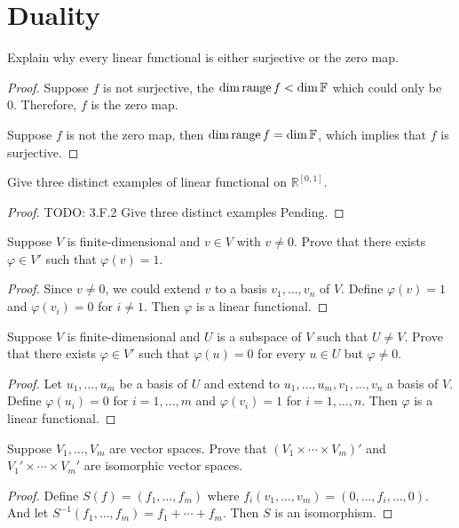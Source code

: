 \section{Duality}

\begin{exercise}
Explain why every linear functional is either surjective or the zero map.
\end{exercise}
\begin{proof}
	Suppose $f$ is not surjective, the $\operatorname{dim} \mathop{\mathrm{range}} f < \operatorname{dim} \mathbb{F}$ which could only be 0. Therefore, $f$ is the zero map. \par
	Suppose $f$ is not the zero map, then $\operatorname{dim} \mathop{\mathrm{range}} f = \operatorname{dim} \mathbb{F}$, which implies that $f$ is surjective.
\end{proof}

\begin{exercise}
Give three distinct examples of linear functional on $\mathbb{R}^{[0,1]}$.
\end{exercise}
\begin{proof}
	TODO: 3.F.2 Give three distinct examples Pending.
\end{proof}

\newpage
\begin{exercise}
Suppose $V $ is finite-dimensional and $v \in V$ with $v \neq 0.$ Prove that there exists $\varphi \in V'$ such that $\varphi(v) = 1$.
\end{exercise}
\begin{proof}
	Since $v \neq 0$, we could extend $v$ to a basis $v_1, \ldots ,v_n$ of $V$. Define $\varphi(v) = 1$ and $\varphi(v_i) = 0$ for $i \neq 1$. Then $\varphi$ is a linear functional.
\end{proof}

\begin{exercise}
Suppose $V $ is finite-dimensional and $U$ is a subspace of $V$ such that $U \neq V$. Prove that there exists $\varphi \in V'$ such that $\varphi(u) = 0$ for every $u \in U$ but $\varphi \neq 0$.
\end{exercise}
\begin{proof}
	Let $u_1, \ldots , u_m$ be a basis of $U$ and extend to $u_1, \ldots, u_m, v_1, \ldots , v_n$ a basis of $V$. Define $\varphi(u_i) = 0$ for $i = 1, \ldots , m$ and $\varphi(v_i) = 1$ for $i = 1, \ldots , n$. Then $\varphi$ is a linear functional.
\end{proof}

\begin{exercise}
Suppose $V_1 , \ldots , V_m$ are vector spaces. Prove that $(V_1 \times \cdots\times V_m)'$ and $V_1' \times  \cdots \times V_m'$ are isomorphic vector spaces.
\end{exercise}
\begin{proof}
	Define $S(f) = (f_1, \ldots , f_m)$ where $f_i(v_1, \ldots ,v_m) = (0, \ldots , f_i, \ldots ,0)$. And let $S^{-1} (f_1, \ldots ,f_m)= f_1 + \cdots + f_m$. Then $S$ is an isomorphism.
\end{proof}

